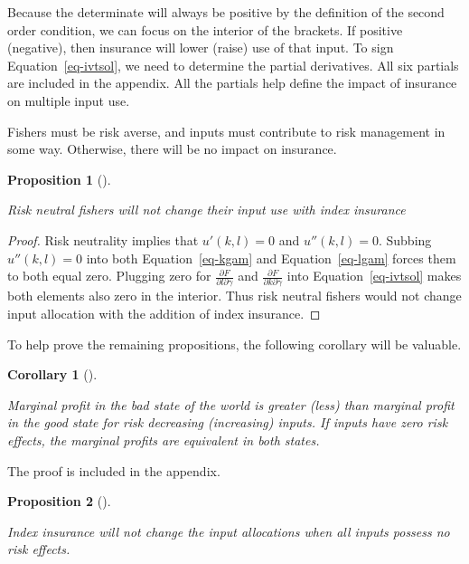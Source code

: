 \documentclass[
  letterpaper,
  DIV=11,
  numbers=noendperiod]{scrartcl}
\theoremstyle{plain}
\newtheorem{corollary}{Corollary}[section]
\theoremstyle{plain}
\newtheorem{proposition}{Proposition}[section]
\theoremstyle{remark}
\begin{document}
Because the determinate will always be positive by the definition of the
second order condition, we can focus on the interior of the brackets. If
positive (negative), then insurance will lower (raise) use of that
input. To sign Equation~\ref{eq-ivtsol}, we need to determine the
partial derivatives. All six partials are included in the appendix. All
the partials help define the impact of insurance on multiple input use.

Fishers must be risk averse, and inputs must contribute to risk
management in some way. Otherwise, there will be no impact on insurance.

\begin{proposition}[]\protect\hypertarget{prp-rn}{}\label{prp-rn}

Risk neutral fishers will not change their input use with index
insurance

\end{proposition}

\begin{proof}

Risk neutrality implies that \(u'(k,l)=0\) and \(u''(k,l)=0\). Subbing
\(u''(k,l)=0\) into both Equation~\ref{eq-kgam} and
Equation~\ref{eq-lgam} forces them to both equal zero. Plugging zero for
\(\frac{\partial F}{\partial l \partial \gamma}\) and
\(\frac{\partial F}{\partial k \partial \gamma}\) into
Equation~\ref{eq-ivtsol} makes both elements also zero in the interior.
Thus risk neutral fishers would not change input allocation with the
addition of index insurance.

\end{proof}

To help prove the remaining propositions, the following corollary will
be valuable.

\begin{corollary}[]\protect\hypertarget{cor-mp}{}\label{cor-mp}

Marginal profit in the bad state of the world is greater (less) than
marginal profit in the good state for risk decreasing (increasing)
inputs. If inputs have zero risk effects, the marginal profits are
equivalent in both states.

\end{corollary}

The proof is included in the appendix.

\begin{proposition}[]\protect\hypertarget{prp-rezero}{}\label{prp-rezero}

Index insurance will not change the input allocations when all inputs
possess no risk effects.

\end{proposition}
\end{document}
